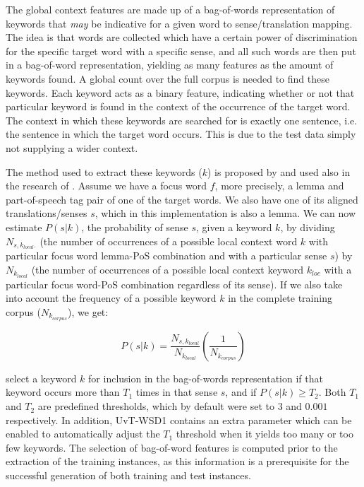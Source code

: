 The global context features are made up of a bag-of-words representation of
keywords that \emph{may} be indicative for a given word to sense/translation
mapping. The idea is that words are collected which have a certain power of
discrimination for the specific target word with a specific sense, and all such
words are then put in a bag-of-word representation, yielding as many features
as the amount of keywords found. A global count over the full corpus is needed
to find these keywords. Each keyword acts as a binary feature, indicating
whether or not that particular keyword is found in the context of the
occurrence of the target word. The context in which these keywords are searched
for is exactly one sentence, i.e. the sentence in which the target word occurs.
This is due to the test data simply not supplying a wider context.

The method used to extract these keywords ($k$) is proposed by \citep{NgL96} and
used also in the research of \citep{Hoste+02}. Assume we have a focus word $f$,
more precisely, a lemma and part-of-speech tag pair of one of the target words.
We also have one of its aligned translations/senses $s$, which in this
implementation is also a lemma. We can now estimate $P(s|k)$, the probability
of sense $s$, given a keyword $k$, by dividing $N_{s,k_{local}.}$ (the number
of occurrences of a possible local context word $k$ with particular focus word
lemma-PoS combination and with a particular sense $s$) by $N_{k_{local}}$ (the
number of occurrences of a possible local context keyword $k_{loc}$ with a
particular focus word-PoS combination regardless of its sense). If we also take
into account the frequency of a possible keyword $k$ in the complete training
corpus ($N_{k_{corpus}}$), we get:


\begin{equation}
P(s|k) = \frac{N_{s,k_{local}}}{N_{k_{local}}}(\frac{1}{N_{k_{corpus}}})
\end{equation}

\citep{Hoste+02} select a keyword $k$ for inclusion in the bag-of-words
representation if that keyword occurs more than $T_1$ times in that sense $s$,
and if $P(s|k) \ge T_2$. Both $T_1$ and $T_2$ are predefined thresholds, which
by default were set to $3$ and $0.001$ respectively. In addition, UvT-WSD1
contains an extra parameter which can be enabled to automatically adjust the
$T_1$ threshold when it yields too many or too few keywords. The selection of
bag-of-word features is computed prior to the extraction of the training
instances, as this information is a prerequisite for the successful generation
of both training and test instances. 

